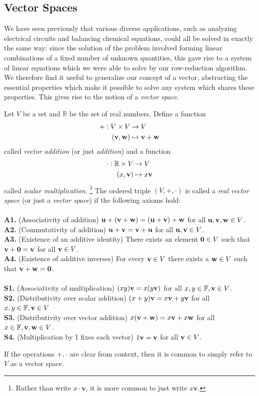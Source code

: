 \documentclass[12pt,letterpaper,reqno]{article}
\numberwithin{equation}{section}
\begin{document}
\subsection{Vector Spaces}
We have seen previously that various diverse applications, such as analyzing electrical circuits and balancing chemical equations, could all be solved in exactly the same way: since the solution of the problem involved forming linear combinations of a fixed number of unknown quantities, this gave rise to a system of linear equations which we were able to solve by our row-reduction algorithm. We therefore find it useful to generalize our concept of a vector, abstracting the essential properties which make it possible to solve any system which shares these properties. This gives rise to the notion of a \emph{vector space}.
\begin{defn} \label{def:vector_space}
	Let $V$ be a set and $\mathbb{R}$ be the set of real numbers. Define a function
\begin{align*}
	+:V\times V &\to V \\
	({\bf v},{\bf w}) &\mapsto {\bf v}+{\bf w}
\end{align*}
called \emph{vector addition} (or just \emph{addition}) and a function
\begin{align*}
	\cdot :\mathbb{R}\times V &\to V \\
	(x,{\bf v}) &\mapsto x{\bf v}
\end{align*}
called \emph{scalar multiplication}. \footnote{Rather than write $x \cdot \mathbf{v}$, it is more common to just write $x\mathbf{v}$.} The ordered triple $(V,+,\cdot)$ is called a \emph{real vector space} (or just a \emph{vector space}) if the following axioms hold: \\
\\
{\bf A1.} (Associativity of addition) ${\bf u}+({\bf v}+{\bf w})=({\bf u}+{\bf v})+{\bf w}$ for all  ${\bf u},{\bf v}, {\bf w} \in V$. \\
{\bf A2.} (Commutativity of addition) ${\bf u}+{\bf v}={\bf v}+{\bf u}$ for all ${\bf u}, {\bf v} \in V$. \\
{\bf A3.} (Existence of an additive identity) There exists an element ${\bf 0} \in V$ such that ${\bf v}+{\bf 0}={\bf v}$ for all ${\bf v} \in V$. \\
{\bf A4.} (Existence of additive inverses) For every ${\bf v} \in V$ there exists a ${\bf w} \in V$ such that ${\bf v}+{\bf w}={\bf 0}$. \\
\\
{\bf S1.} (Associativity of multiplication) $(xy){\bf v}=x(y{\bf v})$ for all $x,y \in \mathbb{F}, {\bf v}\in V$. \\
{\bf S2.} (Distributivity over scalar addition) $(x+y){\bf v}=x{\bf v}+y{\bf v}$ for all $x,y \in \mathbb{F}, {\bf v} \in V$ \\
{\bf S3.} (Distributivity over vector addition) $x({\bf v}+{\bf w})=x{\bf v}+x{\bf w}$ for all $x \in \mathbb{F}, {\bf v}, {\bf w} \in V$. \\
{\bf S4.} (Multiplication by 1 fixes each vector) $1{\bf v}={\bf v}$ for all ${\bf v} \in V$. 
\end{defn}
If the operations $+,\cdot$ are clear from context, then it is common to simply refer to $V$ as a vector space.
\end{document}
